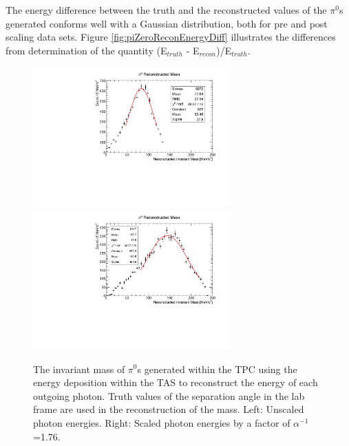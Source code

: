 The energy difference between the truth and the reconstructed values of the $\pi^{0}$s generated conforms well with a Gaussian distribution, both for pre and post scaling data sets. Figure \ref{fig:piZeroReconEnergyDiff} illustrates the differences from determination of the quantity (E$_{truth}$ - E$_{recon}$)/E$_{truth}$.

\begin{figure}[htbp]
\begin{center}
  	\includegraphics[width=76mm]{Chapter4/figures/piZeroReconMassUnscaledNoCuts.pdf}
  	\includegraphics[width=76mm]{Chapter4/figures/piZeroReconMassScaledNoCuts.pdf}
		\caption{The invariant mass of $\pi^{0}$s generated within the TPC using the energy deposition within the TAS to reconstruct the energy of each outgoing photon. Truth values of the separation angle in the lab frame are used in the reconstruction of the mass. Left: Unscaled photon energies. Right: Scaled photon energies by a factor of $\alpha^{-1}$=1.76.}
	\label{fig:piZeroReconMassUnscaled}
\end{center}
\end{figure}

